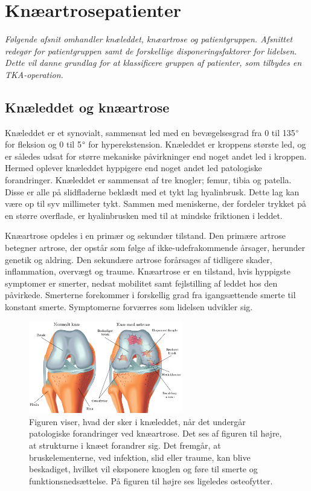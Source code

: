 \section{Knæartrosepatienter} \label{patientforlob}
\textit{Følgende afsnit omhandler knæleddet, knæartrose og patientgruppen. Afsnittet redegør for patientgruppen samt de forskellige disponeringsfaktorer for lidelsen. Dette vil danne grundlag for at klassificere gruppen af patienter, som tilbydes en TKA-operation. }

\subsection{Knæleddet og knæartrose}
Knæleddet er et synovialt, sammensat led med en bevægelsesgrad fra 0 til 135$\degree$ for fleksion og 0 til 5$\degree$ for hyperekstension. Knæleddet er kroppens største led, og er således udsat for større mekaniske påvirkninger end noget andet led i kroppen. Hermed oplever knæleddet hyppigere end noget andet led patologiske forandringer. Knæleddet er sammensat af tre knogler; femur, tibia og patella. Disse er alle på slidfladerne beklædt med et tykt lag hyalinbrusk. Dette lag kan være op til syv millimeter tykt. Sammen med meniskerne, der fordeler trykket på en større overflade, er hyalinbrusken med til at mindske friktionen i leddet. \citep{Moeller2001}

Knæartrose opdeles i en primær og sekundær tilstand. Den primære artrose betegner artrose, der opstår som følge af ikke-udefrakommende årsager, herunder genetik og aldring. Den sekundære artrose forårsages af tidligere skader, inflammation, overvægt og traume. Knæartrose er en tilstand, hvis hyppigste symptomer er smerter, nedsat mobilitet samt fejlstilling af leddet hos den påvirkede. Smerterne forekommer i forskellig grad fra igangsættende smerte til konstant smerte. Symptomerne forværres som lidelsen udvikler sig. \citep{Lind2016b}

\begin{figure}[H] 
	\begin{center}
		\includegraphics[width=0.6\textwidth]{figures/bProblemanalyse/Artose_knaePNG}
	\end{center}
	\caption{Figuren viser, hvad der sker i knæleddet, når det undergår patologiske forandringer ved knæartrose. Det ses af figuren til højre, at strukturne i knæet forandrer sig. Det fremgår, at bruskelementerne, ved infektion, slid eller traume, kan blive beskadiget, hvilket vil eksponere knoglen og føre til smerte og funktionsnedsættelse. På figuren til højre ses ligeledes osteofytter. \citep{schroder} \citep{adobe}} 
	\label{fig:tka_implant} 
\end{figure}

